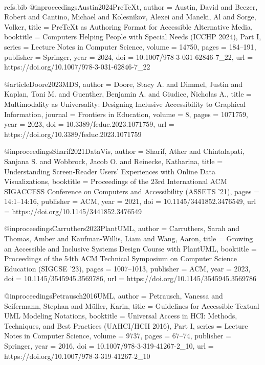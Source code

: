 \
\begin{filecontents*}{refs.bib}
@inproceedings{Austin2024PreTeXt,
  author    = {Austin, David and Beezer, Robert and Cantino, Michael and Kolesnikov, Alexei and Maneki, Al and Sorge, Volker},
  title     = {PreTeXt as Authoring Format for Accessible Alternative Media},
  booktitle = {Computers Helping People with Special Needs (ICCHP 2024), Part I},
  series    = {Lecture Notes in Computer Science},
  volume    = {14750},
  pages     = {184--191},
  publisher = {Springer},
  year      = {2024},
  doi       = {10.1007/978-3-031-62846-7_22},
  url       = {https://doi.org/10.1007/978-3-031-62846-7_22}
}

@article{Doore2023MDS,
  author  = {Doore, Stacy A. and Dimmel, Justin and Kaplan, Toni M. and Guenther, Benjamin A. and Giudice, Nicholas A.},
  title   = {Multimodality as Universality: Designing Inclusive Accessibility to Graphical Information},
  journal = {Frontiers in Education},
  volume  = {8},
  pages   = {1071759},
  year    = {2023},
  doi     = {10.3389/feduc.2023.1071759},
  url     = {https://doi.org/10.3389/feduc.2023.1071759}
}

@inproceedings{Sharif2021DataVis,
  author    = {Sharif, Ather and Chintalapati, Sanjana S. and Wobbrock, Jacob O. and Reinecke, Katharina},
  title     = {Understanding Screen-Reader Users' Experiences with Online Data Visualizations},
  booktitle = {Proceedings of the 23rd International ACM SIGACCESS Conference on Computers and Accessibility (ASSETS '21)},
  pages     = {14:1--14:16},
  publisher = {ACM},
  year      = {2021},
  doi       = {10.1145/3441852.3476549},
  url       = {https://doi.org/10.1145/3441852.3476549}
}

@inproceedings{Carruthers2023PlantUML,
  author    = {Carruthers, Sarah and Thomas, Amber and Kaufman-Willis, Liam and Wang, Aaron},
  title     = {Growing an Accessible and Inclusive Systems Design Course with PlantUML},
  booktitle = {Proceedings of the 54th ACM Technical Symposium on Computer Science Education (SIGCSE '23)},
  pages     = {1007--1013},
  publisher = {ACM},
  year      = {2023},
  doi       = {10.1145/3545945.3569786},
  url       = {https://doi.org/10.1145/3545945.3569786}
}

@inproceedings{Petrausch2016UML,
  author    = {Petrausch, Vanessa and Seifermann, Stephan and M{\"u}ller, Karin},
  title     = {Guidelines for Accessible Textual UML Modeling Notations},
  booktitle = {Universal Access in HCI: Methods, Techniques, and Best Practices (UAHCI/HCII 2016), Part I},
  series    = {Lecture Notes in Computer Science},
  volume    = {9737},
  pages     = {67--74},
  publisher = {Springer},
  year      = {2016},
  doi       = {10.1007/978-3-319-41267-2_10},
  url       = {https://doi.org/10.1007/978-3-319-41267-2_10}
}


\end{filecontents*}
